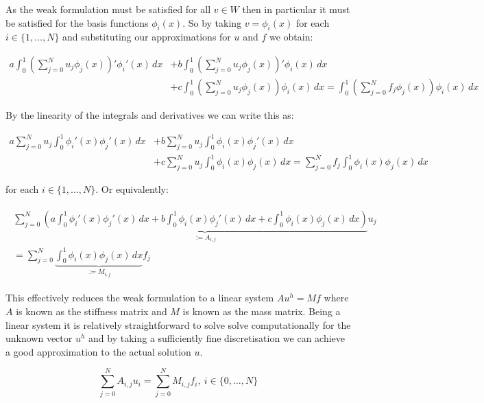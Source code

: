 As the weak formulation  must be satisfied for
all $v \in W$ then in particular it must be satisfied for the basis functions
$\phi_i(x)$. So by taking $v = \phi_i(x)$ for each $i \in \{1,\ldots,N\}$ and
substituting our approximations for $u$ and $f$ we obtain:

\begin{align*}
    a\int_0^1{\left(\sum_{j = 0}^N{u_j\phi_j(x)}\right)'\phi_i'(x)\, dx}
    &+b\int_0^1{\left(\sum_{j = 0}^N{u_j\phi_j(x)}\right)'\phi_i(x)\, dx} \\
    &+c\int_0^1{\left(\sum_{j = 0}^N{u_j\phi_j(x)}\right)\phi_i(x)\, dx} =
    \int_0^1{\left(\sum_{j = 0}^Nf_j\phi_j(x)\right)\phi_i(x)\, dx}
\end{align*}

By the linearity of the integrals and derivatives we can write this as:

\begin{align*}
    a\sum_{j = 0}^Nu_j\int_0^1\phi_i'(x)\phi_j'(x)\, dx
    &+b\sum_{j = 0}^Nu_j\int_0^1\phi_i(x)\phi_j'(x)\, dx \\
    &+c\sum_{j = 0}^Nu_j\int_0^1\phi_i(x)\phi_j(x)\, dx =
    \sum_{j = 0}^Nf_j\int_0^1\phi_i(x)\phi_j(x)\, dx
\end{align*}

for each $i \in \{1,\ldots,N\}$. Or equivalently:

\begin{align}\label{eq:oned-deterministic-discrete}
  \begin{split}
    \sum_{j = 0}^N\underbrace{\left(a\int_0^1\phi_i'(x)\phi_j'(x)\, dx
        + b\int_0^1\phi_i(x)\phi_j'(x)\, dx + c\int_0^1\phi_i(x)\phi_j(x)\, dx\right)}_{:= A_{i,j}}u_j  \\
    = \sum_{j = 0}^N\underbrace{\int_0^1{\phi_i(x)\phi_j(x)}\, dx}_{:= M_{i,j}}f_j
  \end{split}
\end{align}

This effectively reduces the weak formulation 
to a linear system $Au^h = Mf$ where $A$ is known as the stiffness matrix and
$M$ is known as the mass matrix. Being a linear system it is relatively
straightforward to solve solve computationally for the unknown vector $u^h$ and
by taking a sufficiently fine discretisation we can achieve a good
approximation to the actual solution $u$.

\begin{equation}
    \sum_{j=0}^NA_{i,j}u_i = \sum_{j=0}^NM_{i,j}f_i,\ i \in \{0,\ldots,N\}
\end{equation}

